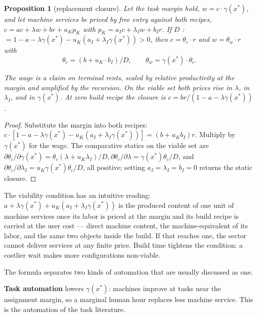 \documentclass[12pt]{article}
\theoremstyle{plain}
\newtheorem{proposition}{Proposition}
\begin{document}
\begin{proposition}[replacement closure]\label{prop:replacement}
Let the task margin hold, $w = c\cdot \gamma (x^*)$, and let machine services be priced by free entry against both recipes, $c = ac + \lambda w + br + u_K p_K$ with $p_K = a_I c + \lambda _I w + b_I r$. If $D$ :$= 1 - a - \lambda \gamma (x^*) - u_K(a_I + \lambda _I\gamma (x^*)) > 0$, then $c = \theta _c\cdot r$ and $w = \theta _w\cdot r$ with
\begin{equation}\label{eq:closure}
\theta _c = (b + u_K\cdot b_I) / D,\qquad \theta _w = \gamma (x^*)\cdot \theta _c.
\end{equation}

The wage is a claim on terminal rents, scaled by relative productivity at the margin and amplified by the recursion. On the viable set both prices rise in $\lambda$, in $\lambda _I$, and in $\gamma (x^*)$. At zero build recipe the closure is $c = br/(1 - a - \lambda \gamma (x^*))$.
\end{proposition}

\begin{proof}
Substitute the margin into both recipes: $c\cdot [1 - a - \lambda \gamma (x^*) - u_K(a_I + \lambda _I\gamma (x^*))] = (b + u_K b_I)r$. Multiply by $\gamma (x^*)$ for the wage. The comparative statics on the viable set are $\partial \theta _c/\partial \gamma (x^*) = \theta _c(\lambda + u_K\lambda _I)/D, \partial \theta _c/\partial \lambda = \gamma (x^*)\theta _c/D$, and $\partial \theta _c/\partial \lambda _I = u_K\gamma (x^*)\theta _c/D$, all positive; setting $a_I = \lambda _I = b_I = 0$ returns the static closure.
\end{proof}

The viability condition has an intuitive reading: $a + \lambda \gamma (x^*) + u_K(a_I + \lambda _I\gamma (x^*))$ is the produced content of one unit of machine services once its labor is priced at the margin and its build recipe is carried at the user cost --- direct machine content, the machine-equivalent of its labor, and the same two objects inside the build. If that reaches one, the sector cannot deliver services at any finite price. Build time tightens the condition: a costlier wait makes more configurations non-viable.

The formula separates two kinds of automation that are usually discussed as one.

\textbf{Task automation} lowers $\gamma (x^*)$: machines improve at tasks near the assignment margin, so a marginal human hour replaces less machine service. This is the automation of the task literature.
\end{document}

